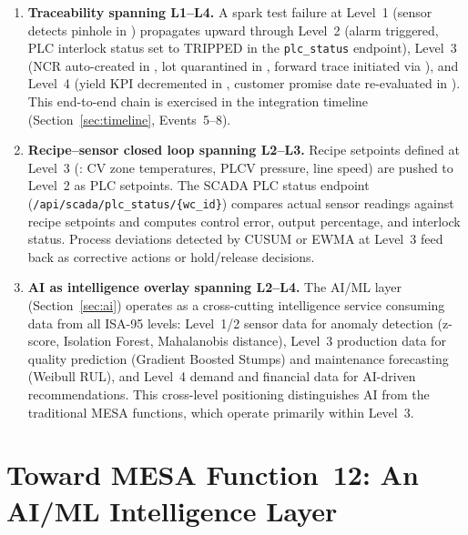 \begin{enumerate}[leftmargin=2em, itemsep=2pt]
\item \textbf{Traceability spanning L1--L4.}  A spark test failure at Level~1
(sensor detects pinhole in ) propagates upward through
Level~2 (alarm triggered, PLC interlock status set to TRIPPED in the
\texttt{plc\_status} endpoint), Level~3 (NCR auto-created in , lot
quarantined in , forward trace initiated via
), and Level~4 (yield KPI decremented in
, customer promise date re-evaluated in
).  This end-to-end chain is exercised in the integration
timeline (Section~\ref{sec:timeline}, Events~5--8).

\item \textbf{Recipe--sensor closed loop spanning L2--L3.}  Recipe setpoints
defined at Level~3 (: CV zone temperatures, PLCV
pressure, line speed) are pushed to Level~2 as PLC setpoints.  The SCADA PLC
status endpoint (\texttt{/api/scada/plc\_status/\{wc\_id\}}) compares actual
sensor readings against recipe setpoints and computes control error, output
percentage, and interlock status.  Process deviations detected by CUSUM or EWMA
at Level~3 feed back as corrective actions or hold/release decisions.

\item \textbf{AI as intelligence overlay spanning L2--L4.}  The AI/ML layer
(Section~\ref{sec:ai}) operates as a cross-cutting intelligence service
consuming data from all ISA-95 levels: Level~1/2 sensor data for anomaly
detection (z-score, Isolation Forest, Mahalanobis distance), Level~3 production
data for quality prediction (Gradient Boosted Stumps) and maintenance
forecasting (Weibull RUL), and Level~4 demand and financial data for
AI-driven recommendations.  This cross-level positioning distinguishes AI
from the traditional MESA functions, which operate primarily within Level~3.
\end{enumerate}


\section{Toward MESA Function~12: An AI/ML Intelligence Layer}\label{sec:mesa12}

